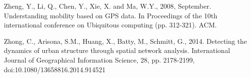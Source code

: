 \documentclass[]{tGIS2e}
\begin{document}
\begin{thebibliography}{9}
Zheng, Y., Li, Q., Chen, Y., Xie, X. and Ma, W.Y., 2008, September. Understanding mobility based on GPS data. In Proceedings of the 10th international conference on Ubiquitous computing (pp. 312-321). ACM.

Zhong, C., Arisona, S.M., Huang, X., Batty, M., Schmitt, G., 2014. Detecting the dynamics of urban structure through spatial network analysis. International Journal of Geographical Information Science, 28, pp. 2178-2199, doi:10.1080/13658816.2014.914521




\end{thebibliography}


%




\label{lastpage}
\end{document}
